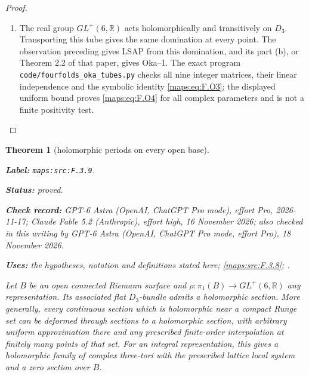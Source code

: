 \documentclass[11pt,a4paper]{article}
\newtheorem{theorem}{Theorem}[section]
\theoremstyle{definition}
\newcommand{\StatementRecord}[4]{\par\smallskip\begingroup\upshape\raggedright\noindent\textbf{Label:} \nolinkurl{#1}.\par\noindent\textbf{Status:} #2.\par\noindent\textbf{Check record:} #3.\par\noindent\textbf{Uses:} #4.\par\endgroup\smallskip}
\newcommand{\CurrentChecker}{GPT-6 Astra (OpenAI, ChatGPT Pro mode, effort Pro), 18 November 2026}
\begin{document}
\begin{proof}
\begin{enumerate}[label=\arabic*.]
\item The real group $GL^+(6,\mathbb R)$ acts holomorphically and
transitively on $D_3$.  Transporting this tube gives the same
domination at every point.  The observation preceding
\cite[Proposition 7.13 and preceding paragraph, pp.~23--24]{IVVOkaOneV5} gives LSAP from
this domination, and its part (b), or Theorem 2.2 of that paper,
gives Oka--1.  The exact program
\texttt{code/fourfolds\_oka\_tubes.py} checks all nine integer
matrices, their linear independence and the symbolic identity
\eqref{maps:eq:F.O3}; the displayed uniform bound proves \eqref{maps:eq:F.O4} for all complex
parameters and is not a finite positivity test.

\end{enumerate}
\end{proof}




\begin{theorem}[holomorphic periods on every open base]\label{maps:src:F.3.9}
\StatementRecord{maps:src:F.3.9}{proved}{GPT-6 Astra (OpenAI, ChatGPT Pro mode), effort Pro, 2026-11-17; Claude Fable 5.2 (Anthropic), effort high, 16 November 2026; also checked in this writing by \CurrentChecker}{the hypotheses, notation and definitions stated here; \cref{maps:src:F.3.8}; \cite[Proposition 7.13(d), p.~24]{IVVOkaOneV5}}


Let $B$ be an open connected Riemann surface and
$\rho:\pi_1(B)\to GL^+(6,\mathbb R)$ any representation.
Its associated flat $D_3$-bundle admits a holomorphic section.
More generally, every continuous section which is holomorphic
near a compact Runge set can be deformed through sections to a
holomorphic section, with arbitrary uniform approximation there
and any prescribed finite-order interpolation at finitely many
points of that set.  For an integral representation, this gives
a holomorphic family of complex three-tori with the prescribed
lattice local system and a zero section over $B$.

\end{theorem}
\end{document}
